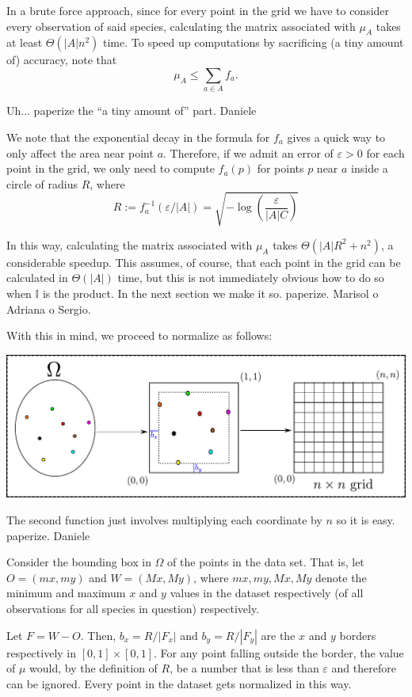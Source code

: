 \documentclass[12pt]{article}
\numberwithin{equation}{section} %
\numberwithin{figure}{section} %
\def\II{{\mathbb{I}}}
\theoremstyle{definition}
\def\tcr#1{\textcolor{MyRed}{#1}}
\begin{document}
	In a brute force approach, since for every point in the grid we have to consider every observation of said species, calculating the matrix associated with $\mu_A$ takes at least $\Theta(|A|n^2)$ time. To speed up computations by sacrificing \tcr{(a tiny amount of)} accuracy, note that 
		$$\mu_A \leq \sum_{a\in A} f_a.$$
		
		\tcr{Uh... paperize the ``a tiny amount of'' part. Daniele}
		
	We note that the exponential decay in the formula for $f_a$ gives a quick way to only affect the area near point $a$. Therefore, if we admit an error of $\varepsilon > 0$ for each point in the grid, we only need to compute $f_a(p)$ for points $p$ near $a$ inside a circle of radius $R$, where
		$$R := f_a^{-1}(\varepsilon/|A|) = \sqrt{-\log\left(\frac{\varepsilon}{|A|C}\right)}$$
	
	In this way, calculating the matrix associated with $\mu_A$ takes $\Theta(|A|R^2 + n^2)$, a considerable speedup. This assumes, of course, that each point in the grid can be calculated in $\Theta(|A|)$ time, but this is not immediately obvious how to do so when $\II$ is the product. In the next section we make it so. \tcr{paperize. Marisol o Adriana o Sergio}.
	
	With this in mind, we proceed to normalize as follows:
	
	\begin{center}
		\includegraphics[scale=0.5]{./continuoamalla.pdf}
	\end{center}
	
	The second function just involves multiplying each coordinate by $n$ so it is easy. \tcr{paperize. Daniele} 
	
	Consider the bounding box in $\Omega$ of the points in the data set. That is, let $O=(mx,my)$ and $W=(Mx,My)$, where $mx,my,Mx,My$ denote the minimum and maximum $x$ and $y$ values in the dataset respectively (of all observations for all species in question) respectively.
	
	Let $F=W-O$. Then, $b_x = R/|F_x|$ and $b_y = R/|F_y|$ are the $x$ and $y$ borders respectively in $[0,1]\times[0,1]$. For any point falling outside the border, the value of $\mu$ would, by the definition of $R$, be a number that is less than $\varepsilon$ and therefore can be ignored. Every point in the dataset gets normalized in this way.
	
\end{document}
